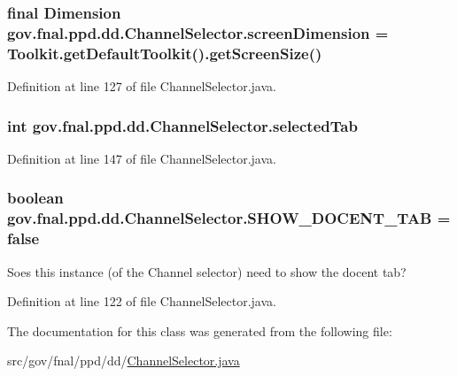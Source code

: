 \hypertarget{classgov_1_1fnal_1_1ppd_1_1dd_1_1ChannelSelector_a78f6040f260da659faca3b09d0617e7e}{
\subsubsection[{screen\-Dimension}]{\setlength{\rightskip}{0pt plus 5cm}final Dimension gov.\-fnal.\-ppd.\-dd.\-Channel\-Selector.\-screen\-Dimension = Toolkit.\-get\-Default\-Toolkit().get\-Screen\-Size()\hspace{0.3cm}{\ttfamily [static]}}}\label{classgov_1_1fnal_1_1ppd_1_1dd_1_1ChannelSelector_a78f6040f260da659faca3b09d0617e7e}


Definition at line 127 of file Channel\-Selector.\-java.

\hypertarget{classgov_1_1fnal_1_1ppd_1_1dd_1_1ChannelSelector_a362da806f034eb1259564c1db7e67ad5}{
\subsubsection[{selected\-Tab}]{\setlength{\rightskip}{0pt plus 5cm}int gov.\-fnal.\-ppd.\-dd.\-Channel\-Selector.\-selected\-Tab\hspace{0.3cm}{\ttfamily [protected]}}}\label{classgov_1_1fnal_1_1ppd_1_1dd_1_1ChannelSelector_a362da806f034eb1259564c1db7e67ad5}


Definition at line 147 of file Channel\-Selector.\-java.

\hypertarget{classgov_1_1fnal_1_1ppd_1_1dd_1_1ChannelSelector_ad9e88d31f70467252e90a59943338df0}{
\subsubsection[{S\-H\-O\-W\-\_\-\-D\-O\-C\-E\-N\-T\-\_\-\-T\-A\-B}]{\setlength{\rightskip}{0pt plus 5cm}boolean gov.\-fnal.\-ppd.\-dd.\-Channel\-Selector.\-S\-H\-O\-W\-\_\-\-D\-O\-C\-E\-N\-T\-\_\-\-T\-A\-B = false\hspace{0.3cm}{\ttfamily [static]}}}\label{classgov_1_1fnal_1_1ppd_1_1dd_1_1ChannelSelector_ad9e88d31f70467252e90a59943338df0}
Soes this instance (of the Channel selector) need to show the docent tab? 

Definition at line 122 of file Channel\-Selector.\-java.



The documentation for this class was generated from the following file\-:\begin{DoxyCompactItemize}
\item 
src/gov/fnal/ppd/dd/\hyperlink{ChannelSelector_8java}{Channel\-Selector.\-java}\end{DoxyCompactItemize}

